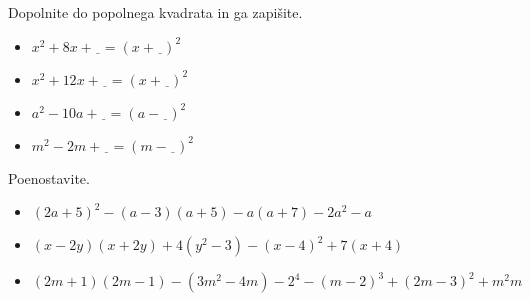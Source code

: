                 \begin{naloga}
                    Dopolnite do popolnega kvadrata in ga zapišite.
                    \begin{itemize}
                        \item $x^2+8x+\underline{\ \ }=(x+\underline{\ \ })^2$ 
                        \item $x^2+12x+\underline{\ \ }=(x+\underline{\ \ })^2$ 
                        \item $a^2-10a+\underline{\ \ }=(a-\underline{\ \ })^2$ 
                        \item $m^2-2m+\underline{\ \ }=(m-\underline{\ \ })^2$ 
                    \end{itemize}
                \end{naloga}


                \begin{naloga}
                    Poenostavite.
                    \begin{itemize}
                        \item $(2a+5)^2-(a-3)(a+5)-a(a+7)-2a^2-a$ 
                        \item $(x-2y)(x+2y)+4(y^2-3)-(x-4)^2+7(x+4)$ 
                        \item $(2m+1)(2m-1)-(3m^2-4m)-2^4-(m-2)^3+(2m-3)^2+m^2m$ 
                    \end{itemize}
                \end{naloga}
